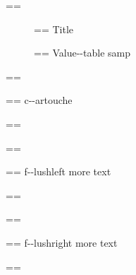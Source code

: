 \documentclass{book}
\makeatletter
\newcommand\GNUTexinfotablestylesamp[1]{\ifstrempty{#1}{}{`\texttt{#1}'}}%
\newenvironment{GNUTexinfopreformatted}{%
  \par\GNUTobeylines\obeyspaces\frenchspacing
  \parskip=\z@\parindent=\z@}{}
{\catcode`\^^M=13 \gdef\GNUTobeylines{\catcode`\^^M=13 \def^^M{\null\par}}}
\newenvironment{GNUTexinfoindented}
  {\begin{list}{}{}
  \item\relax}
  {\end{list}}
\makeatother
\begin{document}
\begin{GNUTexinfoindented}
\begin{description}
\end{description}
\begin{GNUTexinfopreformatted}%
\ttfamily 
\end{GNUTexinfopreformatted}
\begin{description}
\item[] \begin{GNUTexinfopreformatted}%
\ttfamily Title
\end{GNUTexinfopreformatted}
\item[{\parbox[b]{\linewidth}{%
\GNUTexinfotablestylesamp{a{-}{-}samp}\\
\GNUTexinfotablestylesamp{a2{-}{-}samp}}}]
\begin{GNUTexinfopreformatted}%
\ttfamily Value{-}{-}table samp
\end{GNUTexinfopreformatted}
\end{description}
\begin{GNUTexinfopreformatted}%
\ttfamily 
\end{GNUTexinfopreformatted}
\begin{mdframed}[style=GNUTexinfocartouche]
\begin{GNUTexinfopreformatted}%
\ttfamily c{-}{-}artouche
\end{GNUTexinfopreformatted}
\end{mdframed}
\begin{GNUTexinfopreformatted}%
\ttfamily 
\end{GNUTexinfopreformatted}
\begin{flushleft}
\begin{GNUTexinfopreformatted}%
\begin{GNUTexinfopreformatted}%
\ttfamily f{-}{-}lushleft
more text
\end{GNUTexinfopreformatted}
\end{GNUTexinfopreformatted}
\end{flushleft}
\begin{GNUTexinfopreformatted}%
\ttfamily 
\end{GNUTexinfopreformatted}
\begin{flushright}
\begin{GNUTexinfopreformatted}%
\begin{GNUTexinfopreformatted}%
\ttfamily f{-}{-}lushright
more text
\end{GNUTexinfopreformatted}
\end{GNUTexinfopreformatted}
\end{flushright}
\begin{GNUTexinfopreformatted}%

\end{GNUTexinfopreformatted}
\end{GNUTexinfoindented}
\end{document}
